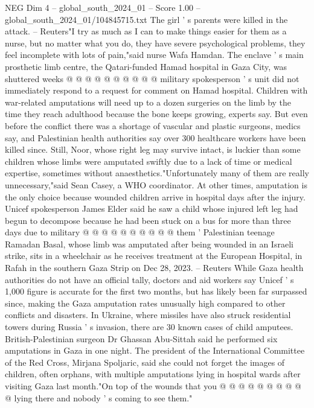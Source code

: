 \begin{textsample}{NEG Dim 4 – global\_south\_2024\_01 – Score 1.00 – global\_south\_2024\_01/104845715.txt}
The girl ' s parents were killed in the attack. -- Reuters"I try as much as I can to make things easier for them as a nurse, but no matter what you do, they have severe psychological problems, they feel incomplete with lots of pain,"said nurse Wafa Hamdan.
The enclave ' s main prosthetic limb centre, the Qatari-funded Hamad hospital in Gaza City, was shuttered weeks @ @ @ @ @ @ @ @ @ @ military spokesperson ' s unit did not immediately respond to a request for comment on Hamad hospital.
Children with war-related amputations will need up to a dozen surgeries on the limb by the time they reach adulthood because the bone keeps growing, experts say.
But even before the conflict there was a shortage of vascular and plastic surgeons, medics say, and Palestinian health authorities say over 300 healthcare workers have been killed since.
Still, Noor, whose right leg may survive intact, is luckier than some children whose limbs were amputated swiftly due to a lack of time or medical expertise, sometimes without anaesthetics."Unfortunately many of them are really unnecessary,"said Sean Casey, a WHO coordinator.
At other times, amputation is the only choice because wounded children arrive in hospital days after the injury.
Unicef spokesperson James Elder said he saw a child whose injured left leg had begun to decompose because he had been stuck on a bus for more than three days due to military @ @ @ @ @ @ @ @ @ @ them ' Palestinian teenage Ramadan Basal, whose limb was amputated after being wounded in an Israeli strike, sits in a wheelchair as he receives treatment at the European Hospital, in Rafah in the southern Gaza Strip on Dec 28, 2023. -- Reuters While Gaza health authorities do not have an official tally, doctors and aid workers say Unicef ' s 1,000 figure is accurate for the first two months, but has likely been far surpassed since, making the Gaza amputation rates unusually high compared to other conflicts and disasters.
In Ukraine, where missiles have also struck residential towers during Russia ' s invasion, there are 30 known cases of child amputees.
British-Palestinian surgeon Dr Ghassan Abu-Sittah said he performed six amputations in Gaza in one night.
The president of the International Committee of the Red Cross, Mirjana Spoljaric, said she could not forget the images of children, often orphans, with multiple amputations lying in hospital wards after visiting Gaza last month."On top of the wounds that you @ @ @ @ @ @ @ @ @ @ lying there and nobody ' s coming to see them."

\end{textsample}
